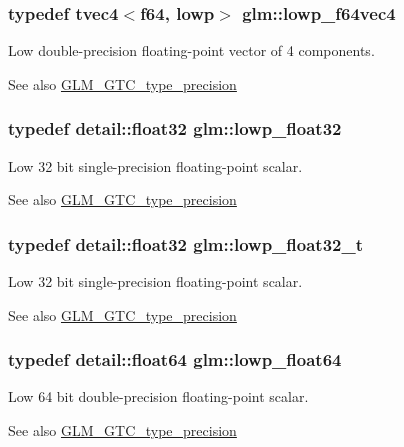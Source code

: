 \subsubsection[{lowp\+\_\+f64vec4}]{\setlength{\rightskip}{0pt plus 5cm}typedef tvec4$<${\bf f64}, lowp$>$ {\bf glm\+::lowp\+\_\+f64vec4}}\label{namespaceglm_a11fc85d24a8ea1cfae7a4b3f88e1644a}
Low double-\/precision floating-\/point vector of 4 components. \begin{DoxySeeAlso}{See also}
\hyperlink{group__gtc__type__precision}{G\+L\+M\+\_\+\+G\+T\+C\+\_\+type\+\_\+precision} 
\end{DoxySeeAlso}
\hypertarget{namespaceglm_a92be8087f3c84504f3a44af1a9efc51e}{}
\subsubsection[{lowp\+\_\+float32}]{\setlength{\rightskip}{0pt plus 5cm}typedef detail\+::float32 {\bf glm\+::lowp\+\_\+float32}}\label{namespaceglm_a92be8087f3c84504f3a44af1a9efc51e}
Low 32 bit single-\/precision floating-\/point scalar. \begin{DoxySeeAlso}{See also}
\hyperlink{group__gtc__type__precision}{G\+L\+M\+\_\+\+G\+T\+C\+\_\+type\+\_\+precision} 
\end{DoxySeeAlso}
\hypertarget{namespaceglm_adfb453b23cb820e3e4e766e047c67dab}{}
\subsubsection[{lowp\+\_\+float32\+\_\+t}]{\setlength{\rightskip}{0pt plus 5cm}typedef detail\+::float32 {\bf glm\+::lowp\+\_\+float32\+\_\+t}}\label{namespaceglm_adfb453b23cb820e3e4e766e047c67dab}
Low 32 bit single-\/precision floating-\/point scalar. \begin{DoxySeeAlso}{See also}
\hyperlink{group__gtc__type__precision}{G\+L\+M\+\_\+\+G\+T\+C\+\_\+type\+\_\+precision} 
\end{DoxySeeAlso}
\hypertarget{namespaceglm_a32e02689f4e83fb269c9047418536f2c}{}
\subsubsection[{lowp\+\_\+float64}]{\setlength{\rightskip}{0pt plus 5cm}typedef detail\+::float64 {\bf glm\+::lowp\+\_\+float64}}\label{namespaceglm_a32e02689f4e83fb269c9047418536f2c}
Low 64 bit double-\/precision floating-\/point scalar. \begin{DoxySeeAlso}{See also}
\hyperlink{group__gtc__type__precision}{G\+L\+M\+\_\+\+G\+T\+C\+\_\+type\+\_\+precision} 
\end{DoxySeeAlso}
\hypertarget{namespaceglm_ac9d64f4e69d6c2eade41a848077866b5}{}
